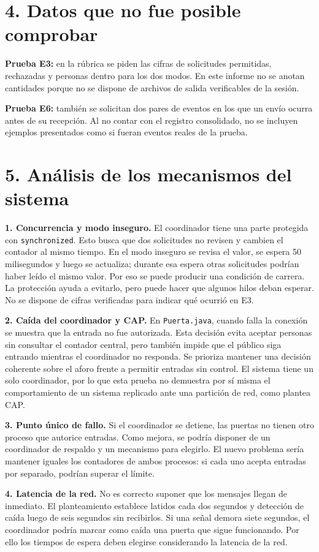 \documentclass[11pt,a4paper]{article}
\begin{document}
\section*{4. Datos que no fue posible comprobar}
\textbf{Prueba E3:} en la rúbrica se piden las cifras de solicitudes permitidas, rechazadas y personas dentro para los dos modos. En este informe no se anotan cantidades porque no se dispone de archivos de salida verificables de la sesión.

\textbf{Prueba E6:} también se solicitan dos pares de eventos en los que un envío ocurra antes de su recepción. Al no contar con el registro consolidado, no se incluyen ejemplos presentados como si fueran eventos reales de la prueba.

\newpage
\section*{5. Análisis de los mecanismos del sistema}
\textbf{1. Concurrencia y modo inseguro.} El coordinador tiene una parte protegida con \texttt{synchronized}. Esto busca que dos solicitudes no revisen y cambien el contador al mismo tiempo. En el modo inseguro se revisa el valor, se espera 50 milisegundos y luego se actualiza; durante esa espera otras solicitudes podrían haber leído el mismo valor. Por eso se puede producir una condición de carrera. La protección ayuda a evitarlo, pero puede hacer que algunos hilos deban esperar. No se dispone de cifras verificadas para indicar qué ocurrió en E3.

\textbf{2. Caída del coordinador y CAP.} En \texttt{Puerta.java}, cuando falla la conexión se muestra que la entrada no fue autorizada. Esta decisión evita aceptar personas sin consultar el contador central, pero también impide que el público siga entrando mientras el coordinador no responda. Se prioriza mantener una decisión coherente sobre el aforo frente a permitir entradas sin control. El sistema tiene un solo coordinador, por lo que esta prueba no demuestra por sí misma el comportamiento de un sistema replicado ante una partición de red, como plantea CAP.

\textbf{3. Punto único de fallo.} Si el coordinador se detiene, las puertas no tienen otro proceso que autorice entradas. Como mejora, se podría disponer de un coordinador de respaldo y un mecanismo para elegirlo. El nuevo problema sería mantener iguales los contadores de ambos procesos: si cada uno acepta entradas por separado, podrían superar el límite.

\textbf{4. Latencia de la red.} No es correcto suponer que los mensajes llegan de inmediato. El planteamiento establece latidos cada dos segundos y detección de caída luego de seis segundos sin recibirlos. Si una señal demora siete segundos, el coordinador podría marcar como caída una puerta que sigue funcionando. Por ello los tiempos de espera deben elegirse considerando la latencia de la red.
\end{document}
